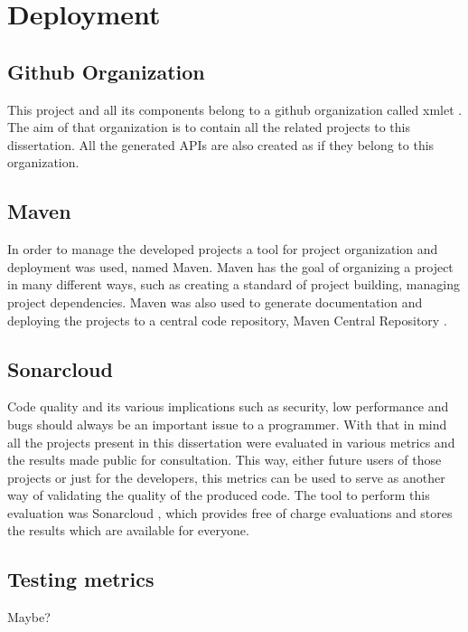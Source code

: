 \chapter{Deployment}
\label{cha:deployment}

\section{Github Organization} %
\label{sec:github}

This project and all its components belong to a github organization called xmlet
. The aim of that organization is to contain all the related projects to this dissertation. All the generated APIs are also created as if they belong to this organization. 

\section{Maven} %
\label{sec:maven}

In order to manage the developed projects a tool for project organization and deployment was used, named Maven. Maven has the goal of organizing a project in many different ways, such as creating a standard of project building, managing project dependencies. Maven was also used to generate documentation and deploying the projects to a central code repository, Maven Central Repository
.

\section{Sonarcloud} %
\label{sec:sonarcloud}

Code quality and its various implications such as security, low performance and bugs should always be an important issue to a programmer. With that in mind all the projects present in this dissertation were evaluated in various metrics and the results made public for consultation. This way, either future users of those projects or just for the developers, this metrics can be used to serve as another way of validating the quality of the produced code. The tool to perform this evaluation was Sonarcloud
, which provides free of charge evaluations and stores the results which are available for everyone.

\section{Testing metrics} %
\label{sec:testingmetrics}

Maybe?